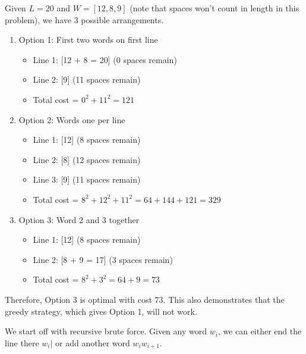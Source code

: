   \begin{example}
    \label{ex:line-breaking-example}
    Given $L = 20$ and $W = [12, 8, 9]$ (note that spaces won't count in length in this problem), we have 3 possible arrangements. 
    \begin{enumerate}
      \item Option 1: First two words on first line
      \begin{itemize}
        \item Line 1: [12 + 8 = 20] (0 spaces remain)
        \item Line 2: [9] (11 spaces remain)
        \item Total cost = $0^2 + 11^2 = 121$
      \end{itemize}

      \item Option 2: Words one per line
      \begin{itemize}
        \item Line 1: [12] (8 spaces remain)
        \item Line 2: [8] (12 spaces remain)
        \item Line 3: [9] (11 spaces remain)
        \item Total cost = $8^2 + 12^2 + 11^2 = 64 + 144 + 121 = 329$
      \end{itemize}

      \item Option 3: Word 2 and 3 together
      \begin{itemize}
        \item Line 1: [12] (8 spaces remain)
        \item Line 2: [8 + 9 = 17] (3 spaces remain)
        \item Total cost = $8^2 + 3^2 = 64 + 9 = 73$
      \end{itemize}
    \end{enumerate}
    Therefore, Option 3 is optimal with cost 73. This also demonstrates that the greedy strategy, which gives Option 1, will not work. 
  \end{example}

  We start off with recursive brute force. Given any word $w_i$, we can either end the line there $w_i |$ or add another word $w_i w_{i+1}$. 


